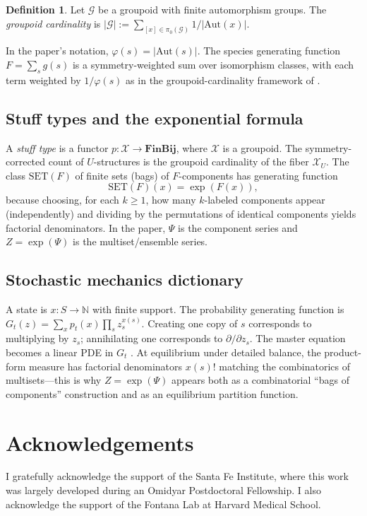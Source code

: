 \documentclass[11pt]{amsart}
\newcommand{\GFspecies}{F}
\newcommand{\GFensemble}{Z}
\newcommand{\GFcomb}{\Psi}
\theoremstyle{definition}
\newtheorem{definition}{Definition}
\theoremstyle{plain}
\theoremstyle{remark}
\begin{document}
\begin{definition}
Let $\mathcal{G}$ be a groupoid with finite automorphism groups.
The \emph{groupoid cardinality} is
$|\mathcal{G}| := \sum_{[x]\in \pi_0(\mathcal{G})}1/|\mathrm{Aut}(x)|$.
\end{definition}

In the paper's notation, $\varphi(s) = |\mathrm{Aut}(s)|$.
The species generating function $\GFspecies=\sum_{s} g(s)$ is a symmetry-weighted sum over isomorphism classes, with each term weighted by $1/\varphi(s)$ as in the groupoid-cardinality framework of \cite{baez2001finite}.

\subsection{Stuff types and the exponential formula}

A \emph{stuff type} is a functor $p:\mathcal{X}\to \mathbf{FinBij}$, where $\mathcal{X}$ is a groupoid.
The symmetry-corrected count of $U$-structures is the groupoid cardinality of the fiber $\mathcal{X}_U$.
The class $\mathrm{SET}(F)$ of finite sets (bags) of $F$-components has generating function
\begin{equation}\label{eq:app_exponential_formula}
\mathrm{SET}(F)(x) = \exp(F(x)),
\end{equation}
because choosing, for each $k\ge 1$, how many $k$-labeled components appear (independently) and dividing by the permutations of identical components yields factorial denominators.
In the paper, $\GFcomb$ is the component series and $\GFensemble = \exp(\GFcomb)$ is the multiset/ensemble series.

\subsection{Stochastic mechanics dictionary}

A state is $x:S\to \mathbb{N}$ with finite support.
The probability generating function is $G_t(z) = \sum_x p_t(x)\prod_{s} z_s^{x(s)}$.
Creating one copy of $s$ corresponds to multiplying by $z_s$; annihilating one corresponds to $\partial/\partial z_s$.
The master equation becomes a linear PDE in $G_t$ \cite{baez2018quantum,baez2015quantum}.
At equilibrium under detailed balance, the product-form measure has factorial denominators $x(s)!$ matching the combinatorics of multisets---this is why $\GFensemble = \exp(\GFcomb)$ appears both as a combinatorial ``bags of components'' construction and as an equilibrium partition function.


\section*{Acknowledgements}

I gratefully acknowledge the support of the Santa Fe Institute, where this work was largely developed during an Omidyar Postdoctoral Fellowship.
I also acknowledge the support of the Fontana Lab at Harvard Medical School.



\end{document}
